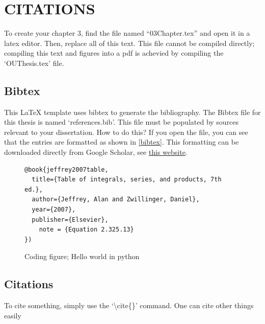 \chapter{CITATIONS}%


To create your chapter 3, find the file named ``03Chapter.tex'' and open it in a latex editor. 
Then, replace all of this text. 
This file cannot be compiled directly; compiling this text and figures into a pdf is achevied by compiling the `OUThesis.tex' file.

\section{Bibtex}

This LaTeX template uses bibtex to generate the bibliography. 
The Bibtex file for this thesis is named `references.bib'. 
This file must be populated by sources relevant to your dissertation. 
How to do this? 
If you open the file, you can see that the entries are formatted as shown in \autoref{bibtex}.
This formatting can be downloaded directly from Google Scholar, see \color{blue}\href{https://libguides.usask.ca/c.php?g=218034&p=1445751}{this website}\color{black}. %

\begin{figure}[bp]
\begin{lstlisting}
@book{jeffrey2007table,
  title={Table of integrals, series, and products, 7th ed.},
  author={Jeffrey, Alan and Zwillinger, Daniel},
  year={2007},
  publisher={Elsevier},
	note = {Equation 2.325.13}
})
\end{lstlisting}
\caption[Coding figure; Hello world in python]{Coding figure; Hello world in python}
\label{bibtex}
\end{figure}


\section{Citations}
To cite something, simply use the `\textbackslash cite\{\}' command\cite{sadiku2007fundamentals}. 
One can cite other things easily\cite{pain2015introduction, jeffrey2007table}

